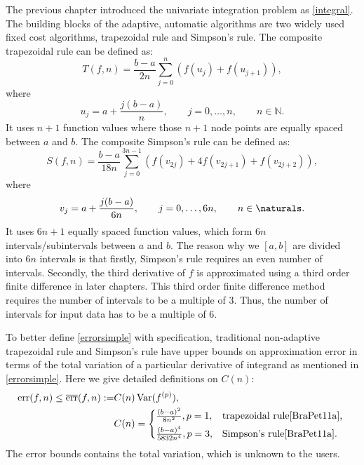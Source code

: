 \documentclass{iitthesis}
\DeclareMathOperator{\Var}{Var}
\theoremstyle{definition}
\theoremstyle{remark}
\begin{document}
The previous chapter introduced the univariate integration problem as \eqref{integral}. The building blocks of the adaptive, automatic algorithms are two widely used fixed cost algorithms, trapezoidal rule and Simpson's rule.
The composite trapezoidal rule can be defined as:
\begin{equation}\label{traprule}
  T(f,n)=\frac{b-a}{2n}\sum_{j=0}^{n}(f(u_{j})+f(u_{j+1})),
\end{equation}
where
\begin{equation}\label{upts}
u_j=a+\frac{j(b-a)}{n}, \qquad j=0, \ldots, n, \qquad n\in\mathbb{N}.
\end{equation}
It uses $n+1$ function values where those $n+1$ node points are equally spaced between $a$ and $b$. The composite Simpson's rule can be defined as:
\begin{equation}\label{simrule}
  S(f,n)=\frac{b-a}{18n}\sum_{j=0}^{3n-1}(f(v_{2j})+4f(v_{2j+1})+f(v_{2j+2})),
\end{equation}
where
\begin{equation}\label{vpts}
v_j=a+\frac{j(b-a)}{6n}, \qquad j=0, \ldots, 6n, \qquad n\in \naturals.
\end{equation}
It uses $6n+1$ equally spaced function values, which form $6n$ intervals/subintervals between $a$ and $b$. The reason why we $[a,b]$ are divided into $6n$ intervals is that firstly, Simpson's rule requires an even number of intervals. Secondly, the third derivative of $f$ is approximated using a third order finite difference in later chapters. This third order finite difference method requires the number of intervals to be a multiple of 3. Thus, the number of intervals for input data has to be a multiple of 6.

To better define \eqref{errorsimple} with specification, traditional non-adaptive trapezoidal rule and Simpson's rule have upper bounds on approximation error in terms of the total variation of a particular derivative of integrand as mentioned in \eqref{errorsimple}. Here we give detailed definitions on $C(n)$:
\begin{align}\label{errorbound}
    \text{err}(f,n)\le\overline{\text{err}}(f,n):=&C(n)\Var(f^{(p)}),\\
    \nonumber&C(n)=
    \begin{cases*}
           \frac{(b-a)^2}{8n^2}, p=1,  & \mbox{trapezoidal rule}\cite[(7.15)]{BraPet11a}, \\
           \frac{(b-a)^4}{5832n^4}, p=3, & \mbox{Simpson's rule}\cite[(p.231)]{BraPet11a}.
    \end{cases*}
\end{align}
The error bounds contains the total variation, which is unknown to the users.
\end{document}
